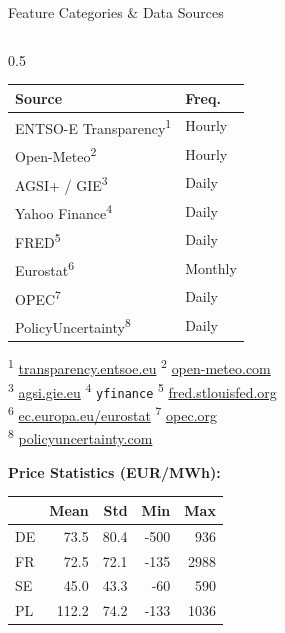 \documentclass[aspectratio=169]{beamer}
\begin{document}
\begin{frame}{Feature Categories \& Data Sources}
\begin{columns}
\begin{column}{0.5\textwidth}
\begin{table}
\scriptsize
\begin{tabular}{l l}
\toprule
\textbf{Source} & \textbf{Freq.} \\
\midrule
ENTSO-E Transparency\textsuperscript{1}  & Hourly \\
Open-Meteo\textsuperscript{2}            & Hourly \\
AGSI+ / GIE\textsuperscript{3}           & Daily \\
Yahoo Finance\textsuperscript{4}          & Daily \\
FRED\textsuperscript{5}                   & Daily \\
Eurostat\textsuperscript{6}              & Monthly \\
OPEC\textsuperscript{7}                  & Daily \\
PolicyUncertainty\textsuperscript{8}     & Daily \\
\bottomrule
\end{tabular}
\end{table}

{\tiny
\textsuperscript{1} \url{transparency.entsoe.eu} \quad
\textsuperscript{2} \url{open-meteo.com} \\
\textsuperscript{3} \url{agsi.gie.eu} \quad
\textsuperscript{4} \texttt{yfinance} \quad
\textsuperscript{5} \url{fred.stlouisfed.org} \\
\textsuperscript{6} \url{ec.europa.eu/eurostat} \quad
\textsuperscript{7} \url{opec.org} \\
\textsuperscript{8} \url{policyuncertainty.com} \\
}

\vspace{0.1cm}
\textbf{Price Statistics (EUR/MWh):}
\vspace{-0.1cm}

\begin{table}
\tiny
\begin{tabular}{l r r r r}
\toprule
& \textbf{Mean} & \textbf{Std} & \textbf{Min} & \textbf{Max} \\
\midrule
DE & 73.5 & 80.4 & -500 & 936 \\
FR & 72.5 & 72.1 & -135 & 2988 \\
SE & 45.0 & 43.3 & -60 & 590 \\
PL & 112.2 & 74.2 & -133 & 1036 \\
\bottomrule
\end{tabular}
\end{table}
\end{column}
\end{columns}
\end{frame}
\end{document}
